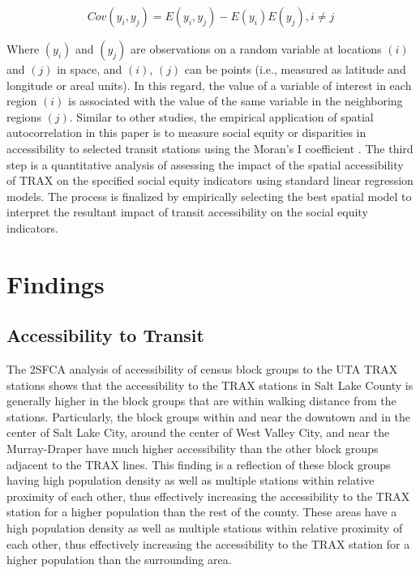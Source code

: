 \documentclass[numbered]{trbunofficial}
\begin{document}
\begin{linenomath}
  \begin{equation}
    Cov(y_i,y_j) = E(y_i,y_j) - E(y_i)E(y_j),i \neq j
  \end{equation}
\end{linenomath}

Where $(y_i)$ and $(y_j)$ are observations on a random variable at locations $(i)$ and $(j)$ in space, and $(i)$, $(j)$ can be points (i.e., measured as latitude and longitude or areal units). In this regard, the value of a variable of interest in each region $(i)$ is associated with the value of the same variable in the neighboring regions $(j)$. Similar to other studies, the empirical application of spatial autocorrelation in this paper is to measure social equity or disparities in accessibility to selected transit stations using the Moran’s I coefficient \cite{Li2020,Zhu2018}. The third step is a quantitative analysis of assessing the impact of the spatial accessibility of TRAX on the specified social equity indicators using standard linear regression models. The process is finalized by empirically selecting the best spatial model to interpret the resultant impact of transit accessibility on the social equity indicators.

\section{Findings}

\subsection{Accessibility to Transit}
The 2SFCA analysis of accessibility of census block groups to the UTA TRAX stations shows that the accessibility to the TRAX stations in Salt Lake County is generally higher in the block groups that are within walking distance from the stations. Particularly, the block groups within and near the downtown and in the center of Salt Lake City, around the center of West Valley City, and near the Murray-Draper have much higher accessibility than the other block groups adjacent to the TRAX lines. This finding is a reflection of these block groups having high population density as well as multiple stations within relative proximity of each other, thus effectively increasing the accessibility to the TRAX station for a higher population than the rest of the county. These areas have a high population density as well as multiple stations within relative proximity of each other, thus effectively increasing the accessibility to the TRAX station for a higher population than the surrounding area.
\end{document}
